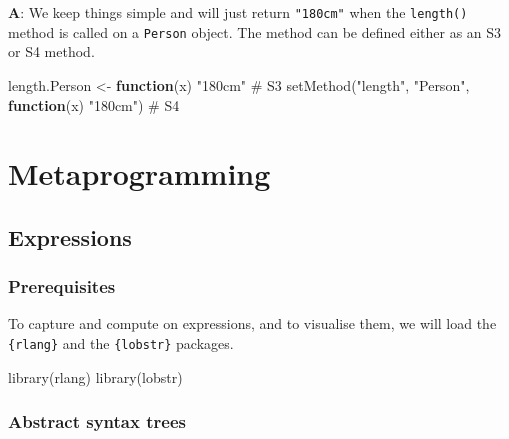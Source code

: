 \documentclass[
]{krantz}
\makeatletter
\newenvironment{Shaded}{\begin{snugshade}}{\end{snugshade}}
\newcommand{\CommentTok}[1]{\textcolor[rgb]{0.56,0.35,0.01}{\textit{#1}}}
\newcommand{\ControlFlowTok}[1]{\textcolor[rgb]{0.13,0.29,0.53}{\textbf{#1}}}
\newcommand{\KeywordTok}[1]{\textcolor[rgb]{0.13,0.29,0.53}{\textbf{#1}}}
\newcommand{\NormalTok}[1]{#1}
\newcommand{\StringTok}[1]{\textcolor[rgb]{0.31,0.60,0.02}{#1}}
\newenvironment{kframe}{%
\medskip{}
\setlength{\fboxsep}{.8em}
 \def\at@end@of@kframe{}%
 \ifinner\ifhmode%
  \def\at@end@of@kframe{\end{minipage}}%
  \begin{minipage}{\columnwidth}%
 \fi\fi%
 \def\FrameCommand##1{\hskip\@totalleftmargin \hskip-\fboxsep
 \colorbox{shadecolor}{##1}\hskip-\fboxsep
     \hskip-\linewidth \hskip-\@totalleftmargin \hskip\columnwidth}%
 \MakeFramed {\advance\hsize-\width
   \@totalleftmargin\z@ \linewidth\hsize
   \@setminipage}}%
 {\par\unskip\endMakeFramed%
 \at@end@of@kframe}
\renewenvironment{Shaded}{\begin{kframe}}{\end{kframe}}
\renewcommand{\KeywordTok} [1]{\textcolor[rgb]{0.00,0.44,0.13}{{#1}}}
\renewcommand{\StringTok}  [1]{\textcolor[rgb]{0.25,0.44,0.63}{{#1}}}
\renewcommand{\CommentTok} [1]{\textcolor[rgb]{0.38,0.63,0.69}{{#1}}}
\renewcommand{\NormalTok}  [1]{{#1}}
\makeatother
\begin{document}
\textbf{{A}}: We keep things simple and will just return \texttt{"180cm"} when the \texttt{length()} method is called on a \texttt{Person} object. The method can be defined either as an S3 or S4 method.

\begin{Shaded}
\begin{Highlighting}[]
\NormalTok{length.Person <-}\StringTok{ }\ControlFlowTok{function}\NormalTok{(x) }\StringTok{"180cm"}  \CommentTok{# S3}
\KeywordTok{setMethod}\NormalTok{(}\StringTok{"length"}\NormalTok{, }\StringTok{"Person"}\NormalTok{, }\ControlFlowTok{function}\NormalTok{(x) }\StringTok{"180cm"}\NormalTok{)  }\CommentTok{# S4}
\end{Highlighting}
\end{Shaded}

\hypertarget{part-metaprogramming}{%
\part{Metaprogramming}\label{part-metaprogramming}}


\hypertarget{expressions}{%
\chapter{Expressions}\label{expressions}}

\hypertarget{prerequisites-9}{%
\section*{Prerequisites}\label{prerequisites-9}}


To capture and compute on expressions, and to visualise them, we will load the \texttt{\{rlang\}} and the \texttt{\{lobstr\}} packages.

\begin{Shaded}
\begin{Highlighting}[]
\KeywordTok{library}\NormalTok{(rlang)}
\KeywordTok{library}\NormalTok{(lobstr)}
\end{Highlighting}
\end{Shaded}


\hypertarget{abstract-syntax-trees}{%
\section{Abstract syntax trees}\label{abstract-syntax-trees}}
\end{document}
